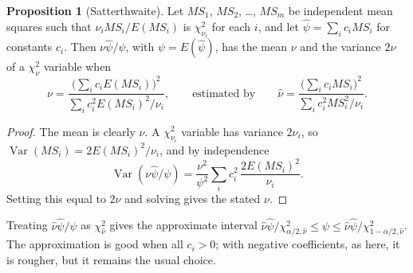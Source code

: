 \documentclass[11pt,a4paper]{article}
\numberwithin{equation}{section}
\DeclareMathOperator{\Var}{Var}
\theoremstyle{definition}
\newtheorem{prop}[thm]{Proposition}
\begin{document}
\begin{prop}[Satterthwaite]\label{prop:satterthwaite}
Let $MS_1$, $MS_2$, \dots, $MS_m$ be independent mean squares such that $\nu_iMS_i/E(MS_i)$ is $\chi^2_{\nu_i}$ for each $i$, and let $\hat\psi = \sum_ic_iMS_i$ for constants $c_i$. Then $\nu\hat\psi/\psi$, with $\psi = E(\hat\psi)$, has
the mean $\nu$ and the variance $2\nu$ of a $\chi^2_\nu$ variable when
\[
\nu = \frac{\bigl(\sum_ic_iE(MS_i)\bigr)^2}{\sum_ic_i^2E(MS_i)^2/\nu_i} , \qquad \text{estimated by} \qquad \hat\nu = \frac{\bigl(\sum_ic_iMS_i\bigr)^2}{\sum_ic_i^2MS_i^2/\nu_i} .
\]
\end{prop}

\begin{proof}
The mean is clearly $\nu$. A $\chi^2_{\nu_i}$ variable has variance $2\nu_i$, so $\Var(MS_i) = 2E(MS_i)^2/\nu_i$, and by independence
\[
\Var(\nu\hat\psi/\psi) = \frac{\nu^2}{\psi^2}\sum_ic_i^2\,\frac{2E(MS_i)^2}{\nu_i} .
\]
Setting this equal to $2\nu$ and solving gives the stated $\nu$.
\end{proof}

Treating $\hat\nu\hat\psi/\psi$ as $\chi^2_{\hat\nu}$ gives the approximate interval $\hat\nu\hat\psi/\chi^2_{\alpha/2, \hat\nu} \le \psi \le \hat\nu\hat\psi/\chi^2_{1-\alpha/2, \hat\nu}$. The approximation is good when all $c_i > 0$; with
negative coefficients, as here, it is rougher, but it remains the usual choice.
\end{document}
